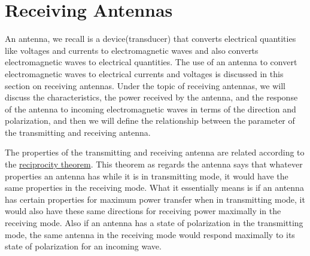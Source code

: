 \chapter{Receiving Antennas}
An antenna, we recall is a device(transducer) that converts electrical quantities like voltages and currents to electromagnetic waves and also converts electromagnetic waves to electrical quantities. The use of an antenna to convert electromagnetic waves to electrical currents and voltages is discussed in this section on receiving antennas. Under the topic of receiving antennas, we will discuss the characteristics, the power received by the antenna, and the response of the antenna to incoming electromagnetic waves in terms of the direction and polarization, and then we will define the relationship between the parameter of the transmitting and receiving antenna.

The properties of the transmitting and receiving antenna are related according to the \underline{reciprocity theorem}. This theorem as regards the antenna says that whatever properties an antenna has while it is in transmitting mode, it would have the same properties in the receiving mode. What it essentially means is if an antenna has certain properties for maximum power transfer when in transmitting mode, it would also have these same directions for receiving power maximally in the receiving mode. Also if an antenna has a state of polarization in the transmitting mode, the same antenna in the receiving mode would respond maximally to its state of polarization for an incoming wave.

